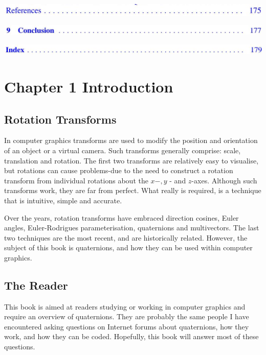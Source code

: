 \documentclass[10pt]{article}
\begin{document}
\begin{center}
\includegraphics[max width=\textwidth]{2023_04_20_41f1ceac5a31dc7d1b59g-013(7)}
\end{center}

\begin{center}
\includegraphics[max width=\textwidth]{2023_04_20_41f1ceac5a31dc7d1b59g-013(4)}
\end{center}

\begin{center}
\includegraphics[max width=\textwidth]{2023_04_20_41f1ceac5a31dc7d1b59g-013(11)}
\end{center}

\section{Chapter 1
Introduction}
\subsection{Rotation Transforms}
In computer graphics transforms are used to modify the position and orientation of an object or a virtual camera. Such transforms generally comprise: scale, translation and rotation. The first two transforms are relatively easy to visualise, but rotations can cause problems-due to the need to construct a rotation transform from individual rotations about the $x-, y$ - and $z$-axes. Although such transforms work, they are far from perfect. What really is required, is a technique that is intuitive, simple and accurate.

Over the years, rotation transforms have embraced direction cosines, Euler angles, Euler-Rodrigues parameterisation, quaternions and multivectors. The last two techniques are the most recent, and are historically related. However, the subject of this book is quaternions, and how they can be used within computer graphics.

\subsection{The Reader}
This book is aimed at readers studying or working in computer graphics and require an overview of quaternions. They are probably the same people I have encountered asking questions on Internet forums about quaternions, how they work, and how they can be coded. Hopefully, this book will answer most of these questions.
\end{document}
